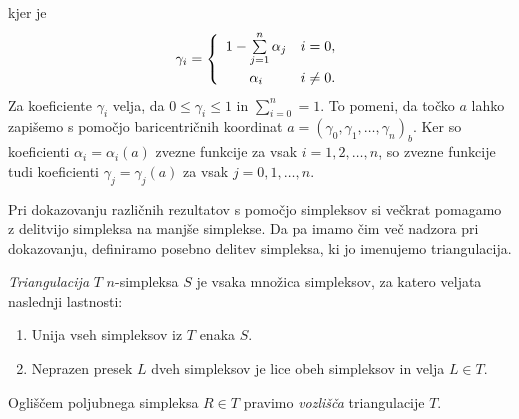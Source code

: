 \documentclass[mat1]{fmfdelo}
\newcommand{\0}{\underline{0}}
\begin{document}
\begin{dokaz}
kjer je
\[  \gamma_i =  \left\{
\begin{array}{cl}\vspace{3pt}
	1 -\sum\limits_{j=1}^n \alpha_j & i = 0,\\
	\alpha_i & i \neq 0. \\
\end{array} 
\right. \]
Za koeficiente $\gamma_i$ velja, da $0 \leq \gamma_i \leq 1$ in $\sum\limits_{i=0}^n = 1$. To pomeni, da točko $a$ lahko zapišemo s pomočjo baricentričnih koordinat $a = (\gamma_0, \gamma_1, \dots, \gamma_n)_b$. Ker so koeficienti $\alpha_i = \alpha_i(a)$ zvezne funkcije za vsak $i = 1, 2, \dots, n$, so zvezne funkcije tudi koeficienti $\gamma_j = \gamma_j(a)$ za vsak $j = 0, 1, \dots, n$.
\end{dokaz}
Pri dokazovanju različnih rezultatov s pomočjo simpleksov si večkrat pomagamo z delitvijo simpleksa na manjše simplekse. Da pa imamo čim več nadzora pri dokazovanju, definiramo posebno delitev simpleksa, ki jo imenujemo triangulacija.

\begin{definicija}
\emph{Triangulacija} $T$ $n$-simpleksa $S$ je vsaka množica simpleksov, za katero veljata naslednji lastnosti:
\begin{enumerate}
\item Unija vseh simpleksov iz $T$ enaka $S$.
\item Neprazen presek $L$ dveh simpleksov je lice obeh simpleksov in velja $L \in T$.
\end{enumerate}
Ogliščem poljubnega simpleksa $R \in T$ pravimo \emph{vozlišča} triangulacije $T$.
\end{definicija}
\end{document}
